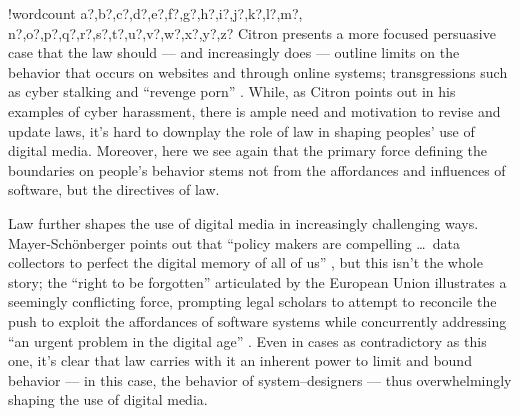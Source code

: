 \documentclass[11pt]{article}
\newcounter{words}
\newenvironment{counted}{%
  \setcounter{words}{0}
  \SearchList!{wordcount}{\stepcounter{words}}
    {a?,b?,c?,d?,e?,f?,g?,h?,i?,j?,k?,l?,m?,
    n?,o?,p?,q?,r?,s?,t?,u?,v?,w?,x?,y?,z?}
  \UndoBoundary{'}
  \SearchOrder{p;}}{%
  \StopSearching}
\begin{document}
\begin{counted}
Citron presents a more focused persuasive case that the law should %
--- and increasingly does ---
outline limits on the behavior that occurs on websites and through online systems;
transgressions such as cyber stalking and ``revenge porn'' \cite{citron2014hate}.
While, as Citron points out in his examples of cyber harassment,
there is ample need and motivation to revise and update laws,
it's hard to downplay the role of law in shaping peoples' use of digital media.
Moreover, here we see again that the primary force defining the boundaries on people's behavior
stems not from the affordances and influences of software, but the directives of law.

Law further shapes the use of digital media in increasingly challenging ways.
Mayer-Sch{\"o}nberger points out that ``policy makers are compelling \ldots\ data collectors to perfect the digital memory of all of us''
\cite{mayer2011delete},
but this isn't the whole story;
the ``right to be forgotten'' articulated by the European Union illustrates a seemingly conflicting force,
prompting legal scholars to attempt to reconcile the push to exploit the affordances of software systems 
while concurrently addressing ``an urgent problem in the digital age''
\cite{rosen2012right}.
Even in cases as contradictory as this one,
it's clear that law carries with it an inherent power to limit and bound behavior
--- in this case, the behavior of system--designers ---
thus overwhelmingly shaping the use of digital media.















\end{counted}
\end{document}
